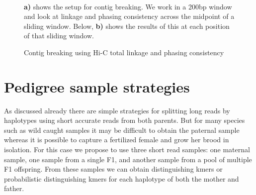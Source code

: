 {\begin{figure}[htbp!]
\caption{Contig breaking using Hi-C total linkage and phasing consistency}
\label{figure:contigbreaking}
\begin{centering}
 \\
\par{\textbf{a)} shows the setup for contig breaking. We work in a 200bp window and look at linkage and phasing consistency across the midpoint of a sliding window. Below, \textbf{b)} shows the results of this at each position of that sliding window. }
\end{centering}
\end{figure}


\section{Pedigree sample strategies}
\par{
As discussed already there are simple strategies for splitting long reads by haplotypes using short accurate reads from both parents. 
But for many species such as wild caught samples it may be difficult to obtain the paternal sample whereas it is possible to capture a 
fertilized female and grow her brood in isolation. For this case we propose to use three short read samples: one maternal sample, one sample 
from a single F1, and another sample from a pool of multiple F1 offspring. From these samples we can obtain distinguishing kmers or probabilistic 
distinguishing kmers for each haplotype of both the mother and father.
}

}
